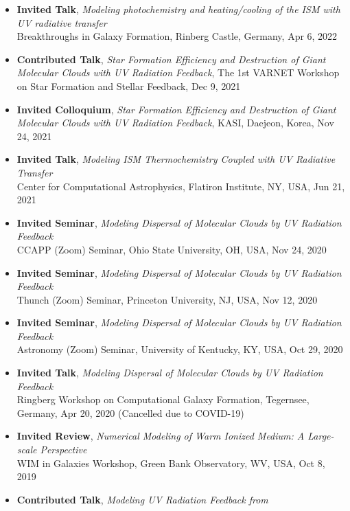 \documentclass[11pt,letterpaper,roman]{moderncv}        %
\newenvironment{benumerate}[1]{
  \let\oldItem\item
  \def\item{\addtocounter{enumi}{-2}\oldItem}
  \begin{enumerate}[itemsep=0.0mm]
    \setcounter{enumi}{#1}
    \addtocounter{enumi}{1}
  }{
  \end{enumerate}
}
\begin{document}
\begin{itemize}
  \setlength\itemsep{0em}
\item \textbf{Invited Talk}, \textit{Modeling photochemistry and heating/cooling
    of the ISM with UV radiative transfer}\\ Breakthroughs in Galaxy Formation,
  Rinberg Castle, Germany, Apr 6, 2022
\item \textbf{Contributed Talk}, \textit{Star Formation Efficiency and
    Destruction of Giant Molecular Clouds with UV Radiation Feedback},
  The 1st VARNET Workshop on Star Formation and Stellar Feedback, Dec 9, 2021
\item \textbf{Invited Colloquium}, \textit{Star Formation Efficiency and
    Destruction of Giant Molecular Clouds with UV Radiation Feedback}, KASI,
  Daejeon, Korea, Nov 24, 2021
\item \textbf{Invited Talk}, \textit{Modeling ISM Thermochemistry Coupled with
    UV Radiative Transfer}\\ Center for Computational Astrophysics, Flatiron Institute, NY, USA, Jun 21, 2021
\item \textbf{Invited Seminar}, \textit{Modeling Dispersal of Molecular Clouds
    by UV Radiation Feedback}\\ CCAPP (Zoom) Seminar, Ohio State University, OH,
  USA, Nov 24, 2020
\item \textbf{Invited Seminar}, \textit{Modeling Dispersal of Molecular Clouds
    by UV Radiation Feedback}\\ Thunch (Zoom) Seminar, Princeton University, NJ,
  USA, Nov 12, 2020
\item \textbf{Invited Seminar}, \textit{Modeling Dispersal of Molecular Clouds
    by UV Radiation Feedback}\\ Astronomy (Zoom) Seminar, University of
  Kentucky, KY, USA, Oct 29, 2020
\item \textbf{Invited Talk}, \textit{Modeling Dispersal of Molecular Clouds by
    UV Radiation Feedback}\\ Ringberg Workshop on Computational Galaxy
  Formation, Tegernsee, Germany, Apr 20, 2020 (Cancelled due to COVID-19)
\item \textbf{Invited Review}, \textit{Numerical Modeling of Warm Ionized
    Medium: A Large-scale Perspective}\\ WIM in Galaxies Workshop, Green Bank
  Observatory, WV, USA, Oct 8, 2019
\item \textbf{Contributed Talk}, \textit{Modeling UV Radiation Feedback from
}
\end{itemize}
\end{document}
